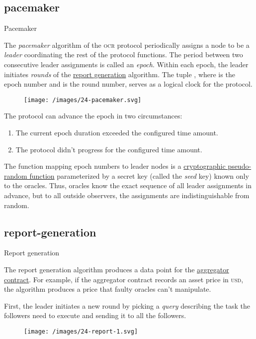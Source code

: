 \documentclass{article}
\begin{document}
\subsection{pacemaker}{Pacemaker}

The \emph{pacemaker} algorithm of the \textsc{ocr} protocol periodically assigns a node to be a \emph{leader} coordinating the rest of the protocol functions.
The period between two consecutive leader assignments is called an \emph{epoch}.
Within each epoch, the leader initiates \emph{rounds} of the \href{#report-generation}{report generation} algorithm.
The tuple , where  is the epoch number and  is the round number, serves as a logical clock for the protocol.

\begin{figure}[grayscale-diagram]
    \texttt{[image: /images/24-pacemaker.svg]}
\end{figure}

The protocol can advance the epoch in two circumstances:
\begin{enumerate}
    \item The current epoch duration exceeded the configured time amount.
    \item The protocol didn't progress for the configured time amount.
\end{enumerate}

The function mapping epoch numbers to leader nodes is a \href{https://crypto.stanford.edu/pbc/notes/crypto/prf.html}{cryptographic pseudo-random function} parameterized by a secret key (called the \emph{seed} key) known only to the oracles.
Thus, oracles know the exact sequence of all leader assignments in advance, but to all outside observers, the assignments are indistinguishable from random.

\subsection{report-generation}{Report generation}

The report generation algorithm produces a data point for the \href{#aggregator-contract}{aggregator contract}.
For example, if the aggregator contract records an asset price in \textsc{usd}, the algorithm produces a price that faulty oracles can't manipulate.

First, the leader initiates a new round by picking a \emph{query} describing the task the followers need to execute and sending it to all the followers.
\begin{figure}[grayscale-diagram,medium-size]
\texttt{[image: /images/24-report-1.svg]}
\end{figure}
\end{document}
